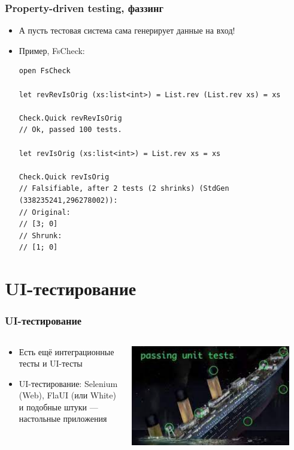 \documentclass{../../slides-style}
\begin{document}
    \begin{frame}[fragile]
        \frametitle{Property-driven testing, фаззинг}
        \begin{itemize}
            \item А пусть тестовая система сама генерирует данные на вход!
            \item Пример, FsCheck:
                \begin{small}
                    \begin{verbatim}
open FsCheck

let revRevIsOrig (xs:list<int>) = List.rev (List.rev xs) = xs

Check.Quick revRevIsOrig
// Ok, passed 100 tests.

let revIsOrig (xs:list<int>) = List.rev xs = xs

Check.Quick revIsOrig
// Falsifiable, after 2 tests (2 shrinks) (StdGen (338235241,296278002)):
// Original:
// [3; 0]
// Shrunk:
// [1; 0]
                    \end{verbatim}
                \end{small}
        \end{itemize}
    \end{frame}

    \section{UI-тестирование}

    \begin{frame}
        \frametitle{UI-тестирование}
        \begin{columns}
            \begin{column}{0.5\textwidth}
                \begin{itemize}
                    \item Есть ещё интеграционные тесты и UI-тесты
                    \item UI-тестирование: Selenium (Web), FlaUI (или White) и подобные штуки --- настольные приложения
                \end{itemize}
            \end{column}
            \begin{column}{0.5\textwidth}
                \includegraphics[width=0.9\textwidth]{titanic.png}
            \end{column}
        \end{columns}
    \end{frame}
\end{document}
